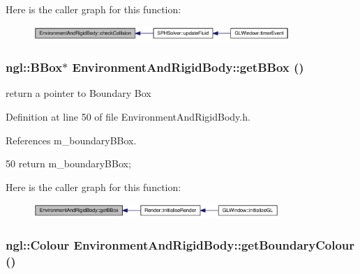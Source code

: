 Here is the caller graph for this function:\nopagebreak
\begin{figure}[H]
\begin{center}
\leavevmode
\includegraphics[width=275pt]{class_environment_and_rigid_body_a5f3b1304b9a7ba38c69367385340e2cb_icgraph}
\end{center}
\end{figure}


\hypertarget{class_environment_and_rigid_body_a9f816e09b8e10a8b90eca8c844c103b5}{
\subsubsection[{getBBox}]{\setlength{\rightskip}{0pt plus 5cm}ngl::BBox$\ast$ EnvironmentAndRigidBody::getBBox ()}}
\label{class_environment_and_rigid_body_a9f816e09b8e10a8b90eca8c844c103b5}


return a pointer to Boundary Box 



Definition at line 50 of file EnvironmentAndRigidBody.h.



References m\_\-boundaryBBox.




\begin{DoxyCode}
50 {return m_boundaryBBox;}
\end{DoxyCode}




Here is the caller graph for this function:\nopagebreak
\begin{figure}[H]
\begin{center}
\leavevmode
\includegraphics[width=264pt]{class_environment_and_rigid_body_a9f816e09b8e10a8b90eca8c844c103b5_icgraph}
\end{center}
\end{figure}


\hypertarget{class_environment_and_rigid_body_a8ca2c863d79b81cc83b2be0529de0a96}{
\subsubsection[{getBoundaryColour}]{\setlength{\rightskip}{0pt plus 5cm}ngl::Colour EnvironmentAndRigidBody::getBoundaryColour ()}}
\label{class_environment_and_rigid_body_a8ca2c863d79b81cc83b2be0529de0a96}


